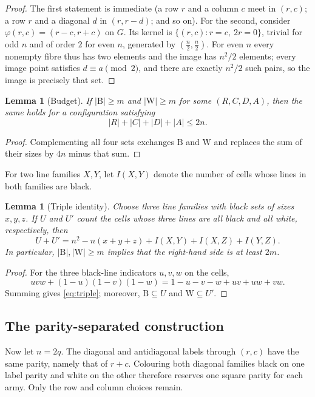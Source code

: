 \documentclass[11pt]{amsart}
\newtheorem{lemma}[theorem]{Lemma}
\theoremstyle{definition}
\theoremstyle{remark}
\newcommand{\Bl}{\mathrm{B}}
\newcommand{\Wh}{\mathrm{W}}
\begin{document}
\begin{proof}
The first statement is immediate (a row $r$ and a column $c$ meet in $(r,c)$; a row $r$ and a diagonal $d$ in $(r,r-d)$; and so on). For the second, consider $\varphi(r,c)=(r-c,r+c)$ on $G$. Its kernel is $\{(r,c):r=c,\ 2r=0\}$, trivial for odd $n$ and of order $2$ for even $n$, generated by $(\frac n2,\frac n2)$. For even $n$ every nonempty fibre thus has two elements and the image has $n^2/2$ elements; every image point satisfies $d\equiv a\pmod 2$, and there are exactly $n^2/2$ such pairs, so the image is precisely that set.
\end{proof}

\begin{lemma}[Budget]\label{lem:budget}
If $|\Bl|\ge m$ and $|\Wh|\ge m$ for some $(R,C,D,A)$, then the same holds
for a configuration satisfying
\[
|R|+|C|+|D|+|A|\le2n.
\]
\end{lemma}

\begin{proof}
Complementing all four sets exchanges $\Bl$ and $\Wh$ and replaces the sum
of their sizes by $4n$ minus that sum.
\end{proof}

For two line families $X,Y$, let $I(X,Y)$ denote the number of cells whose
lines in both families are black.

\begin{lemma}[Triple identity]\label{lem:triple}
Choose three line families with black sets of sizes $x,y,z$.  If $U$ and
$U'$ count the cells whose three lines are all black and all white,
respectively, then
\begin{equation}\label{eq:triple}
U+U'=n^2-n(x+y+z)+I(X,Y)+I(X,Z)+I(Y,Z).
\end{equation}
In particular, $|\Bl|,|\Wh|\ge m$ implies that the right-hand side is at
least $2m$.
\end{lemma}

\begin{proof}
For the three black-line indicators $u,v,w$ on the cells,
\[
uvw+(1-u)(1-v)(1-w)=1-u-v-w+uv+uw+vw.
\]
Summing gives \eqref{eq:triple}; moreover, $\Bl\subseteq U$ and
$\Wh\subseteq U'$.
\end{proof}

\subsection{The parity-separated construction}

Now let $n=2q$.  The diagonal and antidiagonal labels through $(r,c)$ have
the same parity, namely that of $r+c$.  Colouring both diagonal families
black on one label parity and white on the other therefore reserves one
square parity for each army.  Only the row and column choices remain.
\end{document}
